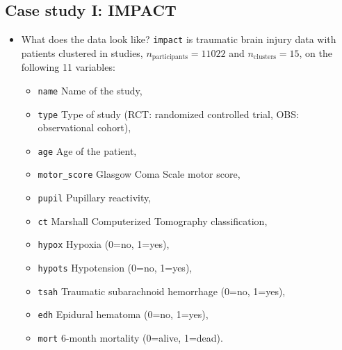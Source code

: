 \documentclass[
]{jss}
\providecommand{\tightlist}{%
  \setlength{\itemsep}{0pt}\setlength{\parskip}{0pt}}
\begin{document}
\hypertarget{case-study-i-impact}{%
\subsection{Case study I: IMPACT}\label{case-study-i-impact}}

\begin{itemize}
\item
  What does the data look like? \texttt{impact} is traumatic brain
  injury data with patients clustered in studies,
  \(n_{\text{participants}} = 11022\) and \(n_{\text{clusters}} = 15\),
  on the following 11 variables:

  \begin{itemize}
  \tightlist
  \item
    \texttt{name} Name of the study,
  \item
    \texttt{type} Type of study (RCT: randomized controlled trial, OBS:
    observational cohort),
  \item
    \texttt{age} Age of the patient,
  \item
    \texttt{motor\_score} Glasgow Coma Scale motor score,
  \item
    \texttt{pupil} Pupillary reactivity,
  \item
    \texttt{ct} Marshall Computerized Tomography classification,
  \item
    \texttt{hypox} Hypoxia (0=no, 1=yes),
  \item
    \texttt{hypots} Hypotension (0=no, 1=yes),
  \item
    \texttt{tsah} Traumatic subarachnoid hemorrhage (0=no, 1=yes),
  \item
    \texttt{edh} Epidural hematoma (0=no, 1=yes),
  \item
    \texttt{mort} 6-month mortality (0=alive, 1=dead).
  \end{itemize}
\end{itemize}
\end{document}
